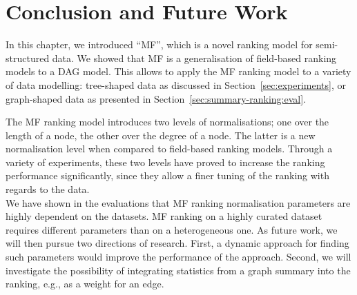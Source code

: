 \section{Conclusion and Future Work}

In this chapter, we introduced ``MF'', which is a novel ranking model for semi-structured data. We showed that MF is a generalisation of field-based ranking models to a DAG model. This allows to apply the MF ranking model to a variety of data modelling: tree-shaped data as discussed in Section~\ref{sec:experiments}, or graph-shaped data as presented in Section~\ref{sec:summary-ranking:eval}.

The MF ranking model introduces two levels of normalisations; one over the length of a node, the other over the degree of a node. The latter is a new normalisation level when compared to field-based ranking models. Through a variety of experiments, these two levels have proved to increase the ranking performance significantly, since they allow a finer tuning of the ranking with regards to the data.\\

We have shown in the evaluations that MF ranking normalisation parameters are highly dependent on the datasets. MF ranking on a highly curated dataset requires different parameters than on a heterogeneous one. As future work, we will then pursue two directions of research. First, a dynamic approach for finding such parameters would improve the performance of the approach. Second, we will investigate the possibility of integrating statistics from a graph summary into the ranking, e.g., as a weight for an edge.

